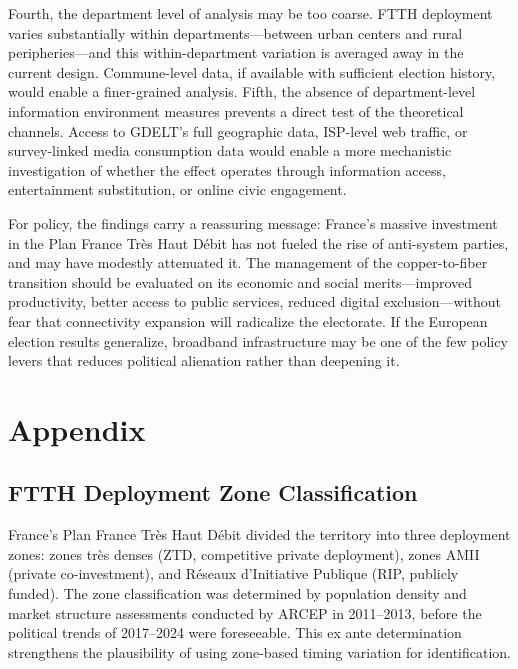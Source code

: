 \documentclass[12pt]{article}
\begin{document}
Fourth, the department level of analysis may be too coarse. FTTH deployment varies substantially within departments---between urban centers and rural peripheries---and this within-department variation is averaged away in the current design. Commune-level data, if available with sufficient election history, would enable a finer-grained analysis. Fifth, the absence of department-level information environment measures prevents a direct test of the theoretical channels. Access to GDELT's full geographic data, ISP-level web traffic, or survey-linked media consumption data would enable a more mechanistic investigation of whether the effect operates through information access, entertainment substitution, or online civic engagement.

For policy, the findings carry a reassuring message: France's massive investment in the Plan France Tr\`es Haut D\'ebit has not fueled the rise of anti-system parties, and may have modestly attenuated it. The management of the copper-to-fiber transition should be evaluated on its economic and social merits---improved productivity, better access to public services, reduced digital exclusion---without fear that connectivity expansion will radicalize the electorate. If the European election results generalize, broadband infrastructure may be one of the few policy levers that reduces political alienation rather than deepening it.

\label{apep_main_text_end}





\clearpage
\appendix
\setcounter{table}{0}
\setcounter{figure}{0}
\renewcommand{\thetable}{A\arabic{table}}
\renewcommand{\thefigure}{A\arabic{figure}}

\section{Appendix}

\subsection{FTTH Deployment Zone Classification}

France's Plan France Tr\`es Haut D\'ebit divided the territory into three deployment zones: zones tr\`es denses (ZTD, competitive private deployment), zones AMII (private co-investment), and R\'eseaux d'Initiative Publique (RIP, publicly funded). The zone classification was determined by population density and market structure assessments conducted by ARCEP in 2011--2013, before the political trends of 2017--2024 were foreseeable. This ex ante determination strengthens the plausibility of using zone-based timing variation for identification.
\end{document}
